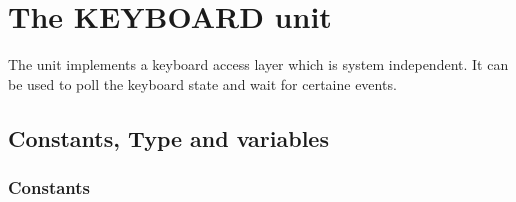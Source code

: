 %
%
%
%
%
%
\chapter{The KEYBOARD unit}

The  unit implements a keyboard access layer which is system
independent. It can be used to poll the keyboard state and wait for certaine
events. 

\section{Constants, Type and variables }

\subsection{Constants}

